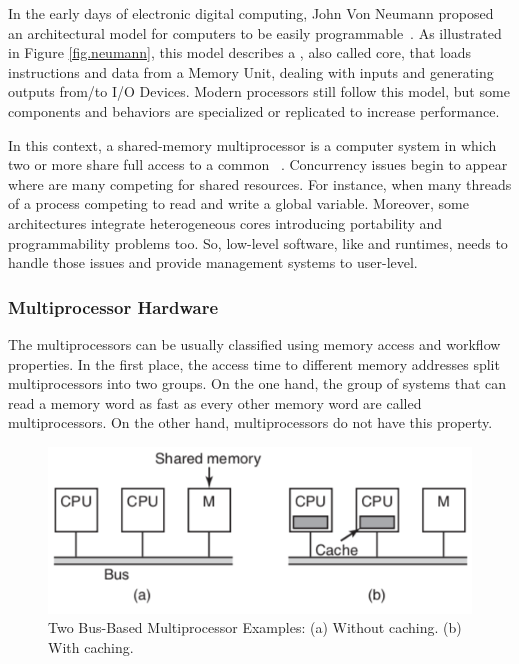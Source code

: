 		In the early days of electronic digital computing, John Von Neumann
		proposed an architectural model for computers to be easily programmable~\cite{von-neumann:model}.
		As illustrated in Figure \ref{fig.neumann}, this model describes a \cpu,
		also called core, that loads instructions and data from a Memory Unit,
		dealing with inputs and generating outputs from/to I/O Devices.
		Modern processors still follow this model, but some components and
		behaviors are specialized or replicated to increase performance.

		In this context, a shared-memory multiprocessor is a computer system
		in which two or more \cpus share full access to a common \ram~\cite{tanenbaum:4ed}.
		Concurrency issues begin to appear where are many \cpus competing for
		shared resources.
		For instance, when many threads of a process competing to read and write a global variable.
		Moreover, some architectures integrate heterogeneous cores introducing portability
		and programmability problems too.
		So, low-level software, like \oses and runtimes, needs to handle those
		issues and provide management systems to user-level.

		\subsubsection{Multiprocessor Hardware}
		\label{sec.multiprocessor-hw}

			The multiprocessors can be usually classified using memory access
			and workflow properties.
			In the first place, the access time to different memory addresses
			split multiprocessors into two groups.
			On the one hand, the group of systems that can read a memory word
			as fast as every other memory word are called \uma multiprocessors.
			On the other hand, \numa multiprocessors do not have this property.

			\begin{figure}[h]
				\centering
				\includegraphics[width=.9\textwidth]{images/uma.png}

				\caption{
					Two Bus-Based \uma Multiprocessor Examples: (a) Without caching. (b) With caching.
				}\par
				\label{fig.uma}
			\end{figure}

